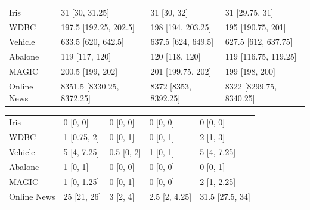 \begin{tabular}{llll}
Iris & 31 [30, 31.25] & 31 [30, 32] & 31 [29.75, 31] \\
WDBC & 197.5 [192.25, 202.5] & 198 [194, 203.25] & 195 [190.75, 201] \\
Vehicle & 633.5 [620, 642.5] & 637.5 [624, 649.5] & 627.5 [612, 637.75] \\
Abalone & 119 [117, 120] & 120 [118, 120] & 119 [116.75, 119.25] \\
MAGIC & 200.5 [199, 202] & 201 [199.75, 202] & 199 [198, 200] \\
Online News & 8351.5 [8330.25, 8372.25] & 8372 [8353, 8392.25] & 8322 [8299.75, 8340.25] \\
\end{tabular}
\begin{tabular}{lllll}
Iris & 0 [0, 0] & 0 [0, 0] & 0 [0, 0] & 0 [0, 0] \\
WDBC & 1 [0.75, 2] & 0 [0, 1] & 0 [0, 1] & 2 [1, 3] \\
Vehicle & 5 [4, 7.25] & 0.5 [0, 2] & 1 [0, 1] & 5 [4, 7.25] \\
Abalone & 1 [0, 1] & 0 [0, 0] & 0 [0, 0] & 0 [0, 1] \\
MAGIC & 1 [0, 1.25] & 0 [0, 1] & 0 [0, 0] & 2 [1, 2.25] \\
Online News & 25 [21, 26] & 3 [2, 4] & 2.5 [2, 4.25] & 31.5 [27.5, 34] \\
\end{tabular}
